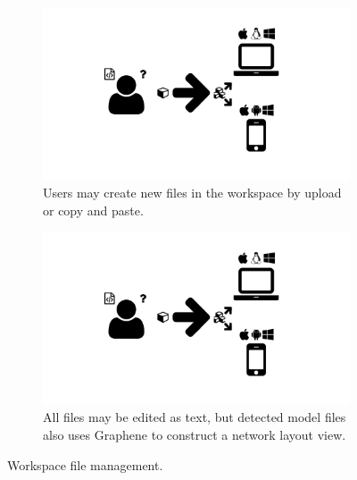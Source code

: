 \begin{figure}
  \centering
  \begin{subfigure}[b]{\textwidth}
    \includegraphics[width=\textwidth,page=11,trim=0.37cm 3.65cm 13.1cm 3.3cm, clip=true]{images/Figures.pdf}
    \caption{Users may create new files in the workspace by upload or copy and paste.}
    \label{Figure:carbon-workspaces-file-upload}
  \end{subfigure}
  \begin{subfigure}[b]{\textwidth}
    \includegraphics[width=\textwidth,page=11,trim=13.1cm 3.65cm 0.37cm 3.3cm, clip=true]{images/Figures.pdf}
    \caption{All files may be edited as text, but detected model files also uses Graphene to construct a network layout view.}
    \label{Figure:carbon-workspaces-model-view}
  \end{subfigure}
  \caption{Workspace file management.}
  \label{Figure:carbon-workspaces-files}
\end{figure}

